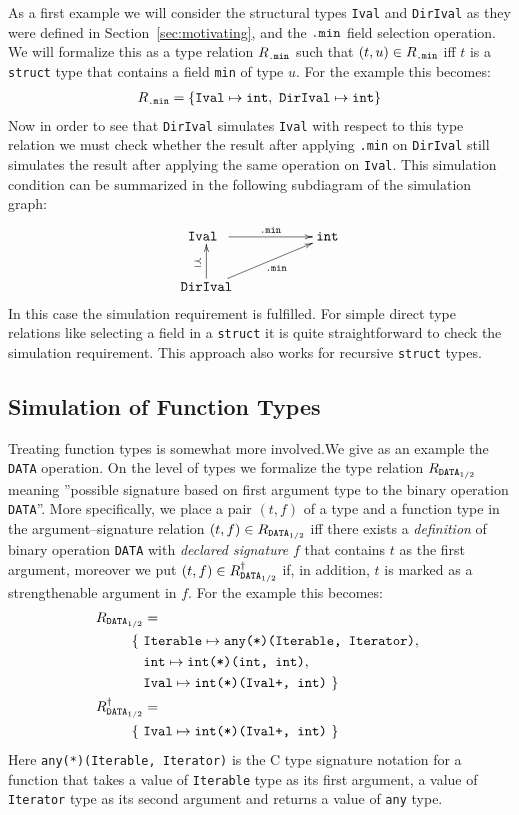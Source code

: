 \documentclass{sigplanconf}
\newcommand{\mt}[1]{\text{\tt #1}}
\begin{document}
As a first example we will consider the structural types \verb+Ival+
and \verb+DirIval+ as they were defined in
Section~\ref{sec:motivating}, and the $\mt{.min}$ field selection
operation. We will formalize this as a type relation $R_\mt{.min}$
such that $(t, u) \in R_\mt{.min}$ iff $t$ is a \verb+struct+ type
that contains a field \verb+min+ of type $u$. For the example this
becomes:
\begin{align*}
R_\mt{.min} = \{ \mt{Ival} \mapsto \mt{int},\ \mt{DirIval} \mapsto
\mt{int} \}
\end{align*}
Now in order to see that \verb+DirIval+ simulates \verb+Ival+ with
respect to this type relation we must check whether the result after
applying \verb+.min+ on \verb+DirIval+ still simulates the result
after applying the same operation on \verb+Ival+. This simulation
condition can be summarized in the following subdiagram of the simulation graph:
\begin{align*}
\xymatrix{
  \mt{Ival }\ar@{<-}[d]_{\preceq} \ar@{->}[rr]^-{\mt{.min}} 
  & & \mt{int} \\ 
  \mt{DirIval} \ar[rru]_-{\mt{.min}} 
}
\end{align*}
In this case the simulation requirement is fulfilled. For simple
direct type relations like selecting a field in a \verb+struct+ it is
quite straightforward to check the simulation requirement. This
approach also works for recursive \verb+struct+ types.

\subsection{Simulation of Function Types}

Treating function types is somewhat more involved.We give as an
example the \verb+DATA+ operation. On the level of types we formalize
the type relation $R_{\mt{DATA}_{1/2}}$ meaning ''possible signature
based on first argument type to the binary operation \verb+DATA+''.
More specifically, we place a pair $(t, f)$ of a type and a function
type in the argument--signature relation $(t, f) \in
R_{\mt{DATA}_{1/2}}$ iff there exists a \emph{definition} of binary
operation \verb+DATA+ with \emph{declared signature} $f$ that contains
$t$ as the first argument, moreover we put $(t, f) \in
R^\dagger_{\mt{DATA}_{1/2}}$ if, in addition, $t$ is marked as a
strengthenable argument in $f$. For the example this becomes:
\begin{align*}
R_{\mt{DATA}_{1/2}} &= \\
\{\ &\mt{Iterable} \mapsto \mt{any(*)(Iterable, Iterator)},\ \\
&\mt{int} \mapsto \mt{int(*)(int, int)},\ \\
&\mt{Ival} \mapsto \mt{int(*)(Ival+, int)}\ \} \\
R^\dagger_{\mt{DATA}_{1/2}} &= \\
\{\  &\mt{Ival} \mapsto \mt{int(*)(Ival+, int)}\ \}
\end{align*}
Here \verb-any(*)(Iterable, Iterator)- is the C type signature
notation for a function that takes a value of \verb+Iterable+ type as
its first argument, a value of \verb+Iterator+ type as its second
argument and returns a value of \verb+any+ type.
\end{document}
